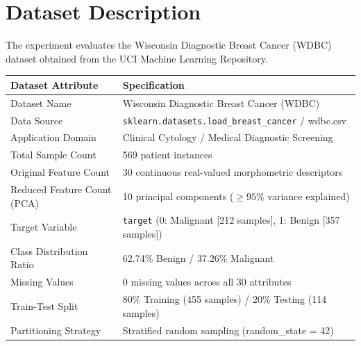 \documentclass[12pt,a4paper]{article}
\begin{document}
\section{Dataset Description}

The experiment evaluates the Wisconsin Diagnostic Breast Cancer (WDBC) dataset obtained from the UCI Machine Learning Repository.

\begin{longtable}{|p{6cm}|p{8cm}|}
\hline
\textbf{Dataset Attribute} & \textbf{Specification} \\ \hline
Dataset Name & Wisconsin Diagnostic Breast Cancer (WDBC) \\ \hline
Data Source & \texttt{sklearn.datasets.load\_breast\_cancer} / wdbc.csv \\ \hline
Application Domain & Clinical Cytology / Medical Diagnostic Screening \\ \hline
Total Sample Count & 569 patient instances \\ \hline
Original Feature Count & 30 continuous real-valued morphometric descriptors \\ \hline
Reduced Feature Count (PCA) & 10 principal components ($\ge 95\%$ variance explained) \\ \hline
Target Variable & \texttt{target} (0: Malignant [212 samples], 1: Benign [357 samples]) \\ \hline
Class Distribution Ratio & 62.74\% Benign / 37.26\% Malignant \\ \hline
Missing Values & 0 missing values across all 30 attributes \\ \hline
Train-Test Split & 80\% Training (455 samples) / 20\% Testing (114 samples) \\ \hline
Partitioning Strategy & Stratified random sampling (random\_state = 42) \\ \hline
\end{longtable}
\end{document}
